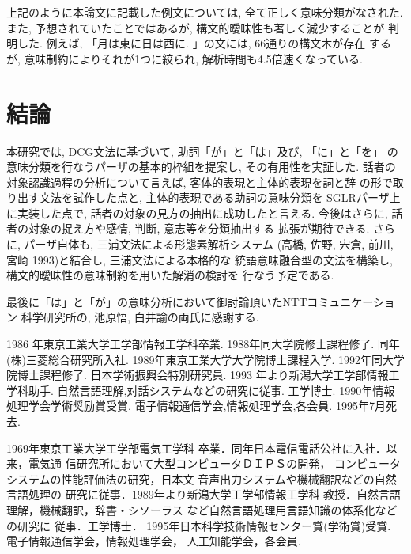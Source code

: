 上記のように本論文に記載した例文については, 全て正しく意味分類がなされた. 
また, 予想されていたことではあるが, 構文的曖昧性も著しく減少することが
判明した. 例えば, 「月は東に日は西に. 」の文には, 66通りの構文木が存在
するが, 意味制約によりそれが1つに絞られ, 解析時間も4.5倍速くなっている. 

\section{結論}

本研究では, DCG文法に基づいて, 助詞「が」と「は」及び, 「に」と「を」
の意味分類を行なうパーザの基本的枠組を提案し, その有用性を実証した.
話者の対象認識過程の分析について言えば, 客体的表現と主体的表現を詞と辞
の形で取り出す文法を試作した点と, 主体的表現である助詞の意味分類を
SGLRパーザ上に実装した点で, 話者の対象の見方の抽出に成功したと言える. 
今後はさらに, 話者の対象の捉え方や感情, 判断, 意志等を分類抽出する
拡張が期待できる. 
さらに, パーザ自体も, 三浦文法による形態素解析システム
(高橋, 佐野, 宍倉, 前川, 宮崎 1993)と結合し, 三浦文法による本格的な
統語意味融合型の文法を構築し, 構文的曖昧性の意味制約を用いた解消の検討を
行なう予定である. 

\acknowledgment

最後に「は」と「が」の意味分析において御討論頂いたNTTコミュニケーション
科学研究所の, 池原悟, 白井諭の両氏に感謝する. 

\nocite{Ikeda1989}
\nocite{Kuno1973}
\nocite{Miura1967a}
\nocite{Miura1967b}
\nocite{Miura1972}
\nocite{Miura1975}
\nocite{Miura1976}
\nocite{Miyazaki1993}
\nocite{Morioka1993}
\nocite{Noguchi1990}
\nocite{Numazaki1991}
\nocite{Takahashi1993}
\nocite{Tokieda1941}
\nocite{Tokieda1950}




\begin{biography}

1986 年東京工業大学工学部情報工学科卒業.
1988年同大学院修士課程修了.
同年(株)三菱総合研究所入社.
1989年東京工業大学大学院博士課程入学.
1992年同大学院博士課程修了.
日本学術振興会特別研究員.
1993 年より新潟大学工学部情報工学科助手.
自然言語理解,対話システムなどの研究に従事.
工学博士.
1990年情報処理学会学術奨励賞受賞.
電子情報通信学会,情報処理学会,各会員.
1995年7月死去.

1969年東京工業大学工学部電気工学科
卒業．同年日本電信電話公社に入社．以来，電気通
信研究所において大型コンピュータＤＩＰＳの開発，
コンピュータシステムの性能評価法の研究，日本文
音声出力システムや機械翻訳などの自然言語処理の
研究に従事．1989年より新潟大学工学部情報工学科
教授．自然言語理解，機械翻訳，辞書・シソーラス
など自然言語処理用言語知識の体系化などの研究に
従事．工学博士．
1995年日本科学技術情報センター賞(学術賞)受賞.
電子情報通信学会，情報処理学会，
人工知能学会，各会員.


\end{biography}


